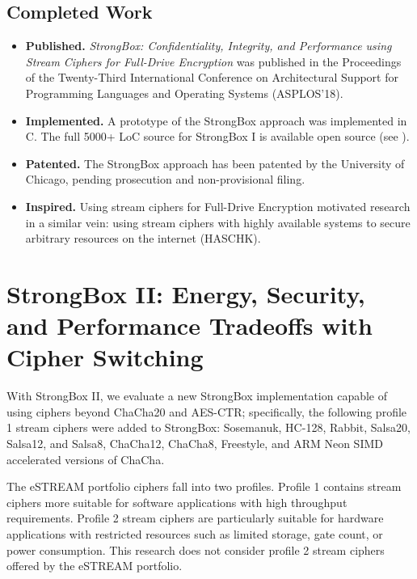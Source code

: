 \subsection{Completed Work}

\begin{itemize}
    \item \textbf{Published.} \textit{StrongBox: Confidentiality, Integrity, and
    Performance using Stream Ciphers for Full-Drive Encryption} was published in
    the Proceedings of the Twenty-Third International Conference on
    Architectural Support for Programming Languages and Operating Systems
    (ASPLOS'18).

    \item \textbf{Implemented.} A prototype of the StrongBox approach was
    implemented in C. The full 5000+ LoC source for StrongBox I is available
    open source (see ).

    \item \textbf{Patented.} The StrongBox approach has been patented by the
    University of Chicago, pending prosecution and non-provisional filing.

    \item \textbf{Inspired.} Using stream ciphers for Full-Drive Encryption
    motivated research in a similar vein: using stream ciphers with highly
    available systems to secure arbitrary resources on the internet (HASCHK).
\end{itemize}

\section{StrongBox II: Energy, Security, and Performance Tradeoffs with Cipher Switching}

With StrongBox II, we evaluate a new StrongBox implementation capable of using
ciphers beyond ChaCha20 and AES-CTR; specifically, the following profile 1
stream ciphers were added to StrongBox: Sosemanuk, HC-128, Rabbit, Salsa20,
Salsa12, and Salsa8, ChaCha12, ChaCha8, Freestyle, and ARM Neon SIMD accelerated
versions of ChaCha.

The eSTREAM portfolio ciphers fall into two profiles. Profile 1 contains stream
ciphers more suitable for software applications with high throughput
requirements. Profile 2 stream ciphers are particularly suitable for hardware
applications with restricted resources such as limited storage, gate count, or
power consumption. This research does not consider profile 2 stream ciphers
offered by the eSTREAM portfolio.

